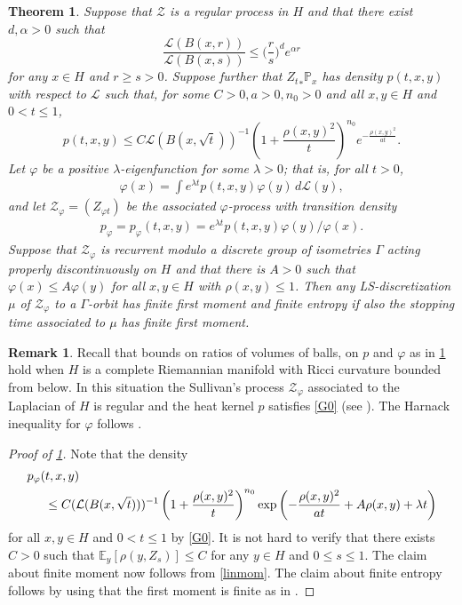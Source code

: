 \documentclass[12pt,a4paper]{amsart}
\newcounter{alph}
\numberwithin{equation}{section}
\newtheorem{thm}[equation]{Theorem}
\theoremstyle{definition}
\newtheorem{rem}[equation]{Remark}
\def\E{\mathbb E}
\def\p{\mathbb P}
\def\vf{\varphi}
\begin{document}
\begin{thm}\label{fm}
Suppose that $\mathcal Z$ is a regular process in $H$ and that there exist  $d , \alpha > 0$ such that
\[
\frac{\mathcal{L}(B(x,r))}{\mathcal{L}(B(x,s))} \leq \big(\frac{r}{s}\big)^d e^{\alpha r}
\]
for any $x \in H$ and $r \geq s > 0$.
Suppose further that ${Z_t}_\ast\p_x$ has density $p(t,x,y)$ with respect to $\mathcal L$ such that, for some $C>0,a>0,n_0>0$
and all $x,y\in H$ and $0 < t \leq 1$,
\begin{equation}\label{G0}
 p(t,x,y)\leq C\mathcal{L}(B(x,\sqrt{t}))^{-1}\left(1+\frac{\rho(x,y)^2}{t}\right)^{n_0} e^{-\frac{\rho(x,y)^2}{at}}.
\end{equation}
Let $\varphi$ be a positive $\lambda$-eigenfunction for some $\lambda>0$; that is, for all $t>0$,
\begin{align*}
    \varphi(x) = \int e^{\lambda t}p(t,x,y)\varphi(y)\,d\mathcal{L}(y),
\end{align*}
and let $\mathcal{Z}_\vf=(Z_{\vf t})$ be the associated $\vf$-process with transition density
\begin{align*}
    p_\vf = p_\vf(t,x,y) = e^{\lambda t}p(t,x,y)\vf(y)/\vf(x).
\end{align*}
Suppose that $\mathcal{Z}_\varphi$ is recurrent modulo a discrete group of isometries $\Gamma$ acting properly discontinuously on $H$
and that there is $A>0$ such that $\varphi(x)\leq A\varphi(y)$ for all $x,y\in H$ with $\rho(x,y)\le1$.
Then any LS-discretization $\mu$ of $\mathcal{Z}_\varphi$ to a $\Gamma$-orbit has finite first moment and finite entropy if also the stopping time associated to $\mu$ has finite first moment. 
\end{thm}

\begin{rem}\label{fmrem}
Recall that bounds on ratios of volumes of balls, on $p$ and $\varphi$ as in \cref{fm} hold when $H$ is a complete Riemannian manifold
with Ricci curvature bounded from below. 
In this situation the Sullivan's process $\mathcal{Z}_\varphi$ associated to the Laplacian of $H$ is regular and the heat kernel $p$ satisfies \eqref{G0} (see  \cite[Theorem 4.2]{S-C}). The Harnack inequality for $\varphi$ follows \cite[Theorem 6]{CY}.
\end{rem}

\begin{proof}[Proof of \cref{fm}]
Note that the density
\begin{align*}
   & p_\varphi(t,x,y)\\ &\hspace{0.5cm}\le C(\mathcal{L}(B(x,\sqrt{t})))^{-1} \left(1+\frac{\rho(x,y)^2}{t}\right)^{n_0}\exp\left(-\frac{\rho(x,y)^2}{at}+A\rho(x,y)+\lambda t\right)
\end{align*}
for all $x,y \in H$ and $0 < t \leq 1$ by \eqref{G0}.
It is not hard to verify that there exists $C>0$ such that $\E_y[\rho(y,Z_s)] \leq C$ for any $y \in H$ and $0 \leq s \leq 1$.
The claim about finite moment now follows from \cref{linmom}.
The claim about finite entropy follows by using that the first moment is finite as in \cite[Lemma 2.1]{BL}.
\end{proof}
\end{document}
